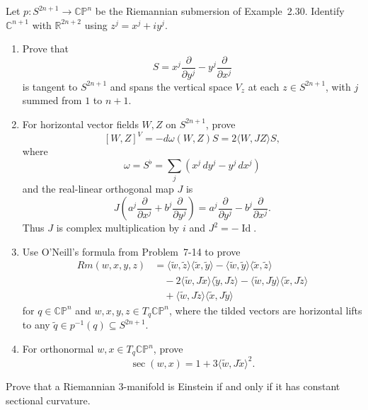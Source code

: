 \begin{exercise}
\label{prob:complex-projective-space-curvature}

Let $p:S^{2n+1}\to\mathbb{CP}^n$ be the Riemannian submersion of
Example~2.30. Identify $\mathbb C^{n+1}$ with $\mathbb R^{2n+2}$ using
$z^j=x^j+iy^j$.
\begin{enumerate}
\item[(a)] Prove that
\[
S=x^j\frac{\partial}{\partial y^j}
-y^j\frac{\partial}{\partial x^j}
\]
is tangent to $S^{2n+1}$ and spans the vertical space $V_z$ at each
$z\in S^{2n+1}$, with $j$ summed from $1$ to $n+1$.
\item[(b)] For horizontal vector fields $W,Z$ on $S^{2n+1}$, prove
\[
[W,Z]^V=-d\omega(W,Z)S=2\langle W,JZ\rangle S,
\]
where
\[
\omega=S^\flat=\sum_j(x^j\,dy^j-y^j\,dx^j)
\]
and the real-linear orthogonal map $J$ is
\[
J\left(a^j\frac{\partial}{\partial x^j}
+b^j\frac{\partial}{\partial y^j}\right)
=a^j\frac{\partial}{\partial y^j}
-b^j\frac{\partial}{\partial x^j}.
\]
Thus $J$ is complex multiplication by $i$ and $J^2=-\operatorname{Id}$.
\item[(c)] Use O'Neill's formula from Problem~7-14 to prove
\begin{align*}
Rm(w,x,y,z)
&=\langle\widetilde w,\widetilde z\rangle
  \langle\widetilde x,\widetilde y\rangle
-\langle\widetilde w,\widetilde y\rangle
  \langle\widetilde x,\widetilde z\rangle\\
&\quad-2\langle\widetilde w,J\widetilde x\rangle
  \langle\widetilde y,J\widetilde z\rangle
-\langle\widetilde w,J\widetilde y\rangle
  \langle\widetilde x,J\widetilde z\rangle\\
&\quad+\langle\widetilde w,J\widetilde z\rangle
  \langle\widetilde x,J\widetilde y\rangle
\end{align*}
for $q\in\mathbb{CP}^n$ and $w,x,y,z\in T_q\mathbb{CP}^n$, where the tilded
vectors are horizontal lifts to any
$\widetilde q\in p^{-1}(q)\subseteq S^{2n+1}$.
\item[(d)] For orthonormal $w,x\in T_q\mathbb{CP}^n$, prove
\[
\sec(w,x)=1+3\langle\widetilde w,J\widetilde x\rangle^2.
\]
\end{enumerate}
\end{exercise}

\begin{exercise}
\label{prob:einstein-sectional-curvature}

Prove that a Riemannian $3$-manifold is Einstein if and only if it has
constant sectional curvature.
\end{exercise}

